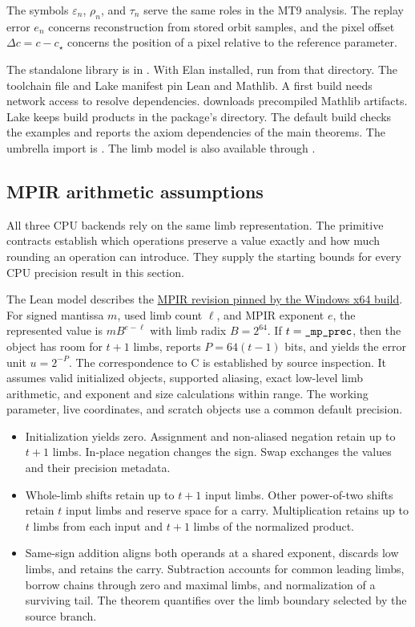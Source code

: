 The symbols \(\varepsilon_n\), \(\rho_n\), and \(\tau_n\) serve the same roles
in the MT9 analysis. The replay error \(e_n\) concerns reconstruction from
stored orbit samples, and the pixel offset \(\Delta c=c-c_\star\) concerns
the position of a pixel relative to the reference parameter.

The standalone library is in . With Elan installed,
run  from that directory. The toolchain file and Lake manifest pin
Lean and Mathlib. A first build needs network access to resolve dependencies.
 downloads precompiled Mathlib artifacts. Lake keeps
build products in the package's  directory. The default build
checks the examples and reports the axiom dependencies of the main theorems.
The umbrella import is . The limb model is also
available through .

\subsection{MPIR arithmetic assumptions}
\label{subsec:reference-orbit-proof-mpir}

All three CPU backends rely on the same limb representation. The primitive
contracts establish which operations preserve a value exactly and how much
rounding an operation can introduce. They supply the starting bounds for
every CPU precision result in this section.

The Lean model describes the
\href{https://github.com/BrianGladman/mpir/tree/dc82b0475dea84d5338356e49176c40be03a5bdf}{MPIR revision pinned by the Windows x64 build}.
For signed mantissa $m$, used limb count $\ell$, and MPIR exponent $e$, the
represented value is $mB^{e-\ell}$ with limb radix $B=2^{64}$. If
$t=\texttt{\_mp\_prec}$, then the object has room for $t+1$ limbs, reports
$P=64(t-1)$ bits, and yields the error unit $u=2^{-P}$.
The correspondence to C is established by source inspection. It assumes valid
initialized objects, supported aliasing, exact low-level limb arithmetic, and
exponent and size calculations within range. The working parameter, live
coordinates, and scratch objects use a common default precision.

\begin{itemize}
\item Initialization yields zero. Assignment and non-aliased negation retain
      up to $t+1$ limbs. In-place negation changes the sign. Swap exchanges
      the values and their precision metadata.
\item Whole-limb shifts retain up to $t+1$ input limbs. Other power-of-two
      shifts retain $t$ input limbs and reserve space for a carry.
      Multiplication retains up to $t$ limbs from each input and $t+1$
      limbs of the normalized product.
\item Same-sign addition aligns both operands at a shared exponent, discards
      low limbs, and retains the carry. Subtraction accounts for common
      leading limbs, borrow chains through zero and maximal limbs, and
      normalization of a surviving tail. The theorem quantifies over the
      limb boundary selected by the source branch.
\end{itemize}

